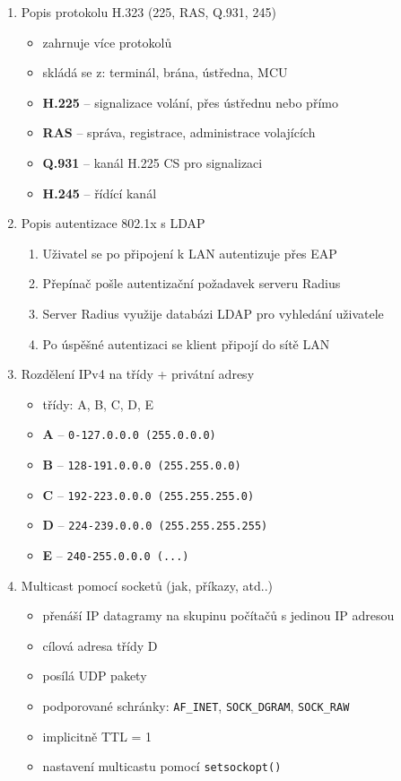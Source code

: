 \documentclass[12pt,a4paper,titlepage,final]{article}
\begin{document}
\begin{enumerate}
	\item Popis protokolu H.323 (225, RAS, Q.931, 245)
	\begin{itemize}
		\item zahrnuje více protokolů
		\item skládá se z: terminál, brána, ústředna, MCU
		\item \textbf{H.225} -- signalizace volání, přes ústřednu nebo přímo
		\item \textbf{RAS} -- správa, registrace, administrace volajících
		\item \textbf{Q.931} -- kanál H.225 CS pro signalizaci
		\item \textbf{H.245} -- řídící kanál 
	\end{itemize}

	\item Popis autentizace 802.1x s LDAP
	\begin{enumerate}
		\item Uživatel se po připojení k LAN autentizuje přes EAP
		\item Přepínač pošle autentizační požadavek serveru Radius
		\item Server Radius využije databázi LDAP pro vyhledání uživatele
		\item Po úspěšné autentizaci se klient připojí do sítě LAN
	\end{enumerate}

	\item Rozdělení IPv4 na třídy + privátní adresy
	\begin{itemize}
		\item třídy: A, B, C, D, E
		\item \textbf{A} -- \texttt{0-127.0.0.0 (255.0.0.0)}
		\item \textbf{B} -- \texttt{128-191.0.0.0 (255.255.0.0)}
		\item \textbf{C} -- \texttt{192-223.0.0.0 (255.255.255.0)}
		\item \textbf{D} -- \texttt{224-239.0.0.0 (255.255.255.255)}
		\item \textbf{E} -- \texttt{240-255.0.0.0 (...)}   	
	\end{itemize}

	\item Multicast pomocí socketů (jak, příkazy, atd..)
	\begin{itemize}
		\item přenáší IP datagramy na skupinu počítačů s jedinou IP adresou
		\item cílová adresa třídy D
		\item posílá UDP pakety
		\item podporované schránky: \texttt{AF\_INET}, \texttt{SOCK\_DGRAM}, \texttt{SOCK\_RAW}
		\item implicitně TTL = 1
		\item nastavení multicastu pomocí \texttt{setsockopt()}  
	\end{itemize}		


\end{enumerate}
\end{document}
